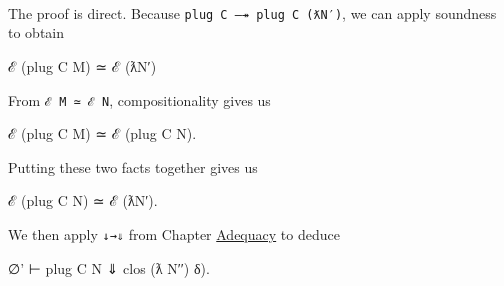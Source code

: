 \begin{fence}
\begin{code}
\AgdaSpace{}%
\AgdaSymbol{=}\AgdaSpace{}%
\AgdaSpace{}%
\AgdaSpace{}%
\<%
\\
%
\>[2]\AgdaSpace{}%
\AgdaSpace{}%
\AgdaSymbol{=}\AgdaSpace{}%
\AgdaSymbol{\{}\AgdaSpace{}%
\AgdaSymbol{=}\AgdaSpace{}%
\AgdaSymbol{\}\{}\AgdaSpace{}%
\AgdaSymbol{=}\AgdaSpace{}%
\AgdaSymbol{\}\{}\AgdaSpace{}%
\AgdaSymbol{=}\AgdaSpace{}%
\AgdaSymbol{\}}\AgdaSpace{}%
\AgdaSpace{}%
\<%
\\
%
\>[2]\AgdaSpace{}%
\AgdaSpace{}%
\AgdaSymbol{=}\AgdaSpace{}%
\AgdaSpace{}%
\AgdaSymbol{(}\AgdaSpace{}%
\AgdaSymbol{)}\AgdaSpace{}%
\AgdaSpace{}%
\<%
\\
\>[2][@{}l@{\AgdaIndent{0}}]%
\>[4]\AgdaSpace{}%
\AgdaSymbol{(}\AgdaSpace{}%
\AgdaSymbol{(}\AgdaSpace{}%
\AgdaSymbol{(}\AgdaSpace{}%
\AgdaSymbol{(}\AgdaSpace{}%
\AgdaSymbol{))))}\<%
\end{code}
\end{fence}

The proof is direct. Because \texttt{plug\ C\ —↠\ plug\ C\ (ƛN′)}, we
can apply soundness to obtain

\begin{myDisplay}
ℰ (plug C M) ≃ ℰ (ƛN′)
\end{myDisplay}

From \texttt{ℰ\ M\ ≃\ ℰ\ N}, compositionality gives us

\begin{myDisplay}
ℰ (plug C M) ≃ ℰ (plug C N).
\end{myDisplay}

Putting these two facts together gives us

\begin{myDisplay}
ℰ (plug C N) ≃ ℰ (ƛN′).
\end{myDisplay}

We then apply \texttt{↓→⇓} from Chapter
\protect\hyperlink{Adequacy}{Adequacy} to deduce

\begin{myDisplay}
∅' ⊢ plug C N ⇓ clos (ƛ N′′) δ).
\end{myDisplay}

